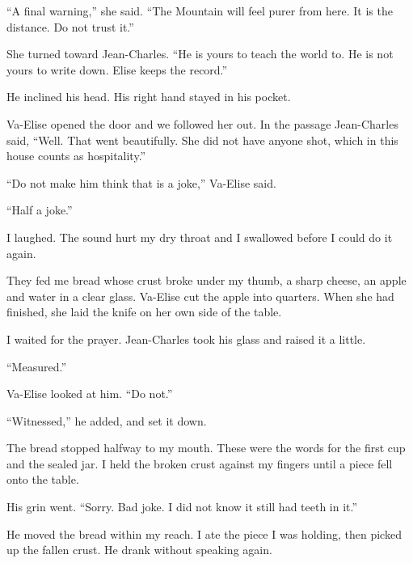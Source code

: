 ``A final warning,'' she said. ``The Mountain will feel purer from here. It is the distance. Do not trust it.''\par

She turned toward Jean-Charles. ``He is yours to teach the world to. He is not yours to write down. Elise keeps the record.''\par

He inclined his head. His right hand stayed in his pocket.\par

Va-Elise opened the door and we followed her out. In the passage Jean-Charles said, ``Well. That went beautifully. She did not have anyone shot, which in this house counts as hospitality.''\par

``Do not make him think that is a joke,'' Va-Elise said.\par

``Half a joke.''\par

I laughed. The sound hurt my dry throat and I swallowed before I could do it again.\par

They fed me bread whose crust broke under my thumb, a sharp cheese, an apple and water in a clear glass. Va-Elise cut the apple into quarters. When she had finished, she laid the knife on her own side of the table.\par

I waited for the prayer. Jean-Charles took his glass and raised it a little.\par

``Measured.''\par

Va-Elise looked at him. ``Do not.''\par

``Witnessed,'' he added, and set it down.\par

The bread stopped halfway to my mouth. These were the words for the first cup and the sealed jar. I held the broken crust against my fingers until a piece fell onto the table.\par

His grin went. ``Sorry. Bad joke. I did not know it still had teeth in it.''\par

He moved the bread within my reach. I ate the piece I was holding, then picked up the fallen crust. He drank without speaking again.\par

